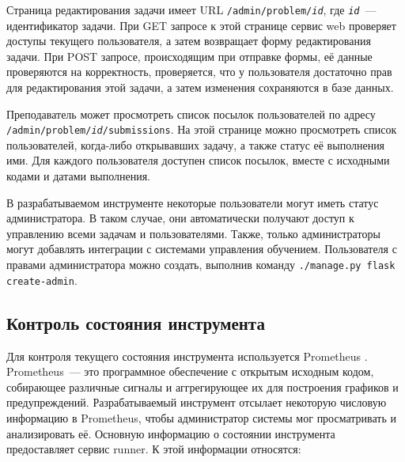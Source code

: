 \documentclass[a4paper,article,14pt]{extarticle}
\begin{document}
Страница редактирования задачи имеет URL \texttt{/admin/problem/\textit{id}}, где \texttt{\textit{id}}~--- идентификатор задачи. При GET запросе к этой странице сервис web проверяет доступы текущего пользователя, а затем возвращает форму редактирования задачи. При POST запросе, происходящим при отправке формы, её данные проверяются на корректность, проверяется, что у пользователя достаточно прав для редактирования этой задачи, а затем изменения сохраняются в базе данных.

Преподаватель может просмотреть список посылок пользователей по адресу \texttt{/admin/problem/\textit{id}/submissions}. На этой странице можно просмотреть список пользователей, когда-либо открывавших задачу, а также статус её выполнения ими. Для каждого пользователя доступен список посылок, вместе с исходными кодами и датами выполнения.

В разрабатываемом инструменте некоторые пользователи могут иметь статус администратора. В таком случае, они автоматически получают доступ к управлению всеми задачам и пользователями. Также, только администраторы могут добавлять интеграции с системами управления обучением. Пользователя с правами администратора можно создать, выполнив команду \texttt{./manage.py flask create-admin}.

\subsection{Контроль состояния инструмента}

Для контроля текущего состояния инструмента используется Prometheus \cite{prometheus}. Prometheus~--- это программное обеспечение с открытым исходным кодом, собирающее различные сигналы и аггрегирующее их для построения графиков и предупреждений. Разрабатываемый инструмент отсылает некоторую числовую информацию в Prometheus, чтобы администратор системы мог просматривать и анализировать её. Основную информацию о состоянии инструмента предоставляет сервис runner. К этой информации относятся:
\end{document}
